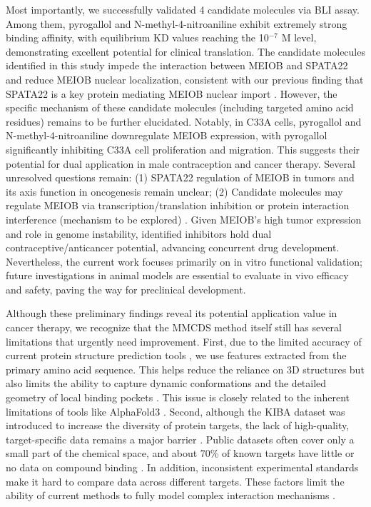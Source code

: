 \documentclass[preprint,12pt]{elsarticle}
\theoremstyle{plain}
\theoremstyle{definition}
\theoremstyle{remark}
\begin{document}
Most importantly, we successfully validated 4 candidate molecules via BLI assay. Among them, pyrogallol and N-methyl-4-nitroaniline exhibit extremely strong binding affinity, with equilibrium $\text{KD}$ values reaching the 10$^{-7}$ M level, demonstrating excellent potential for clinical translation. The candidate molecules identified in this study impede the interaction between MEIOB and SPATA22 and reduce MEIOB nuclear localization, consistent with our previous finding that SPATA22 is a key protein mediating MEIOB nuclear import \cite{10}. However, the specific mechanism of these candidate molecules (including targeted amino acid residues) remains to be further elucidated. Notably, in C33A cells, pyrogallol and N-methyl-4-nitroaniline downregulate MEIOB expression, with pyrogallol significantly inhibiting C33A cell proliferation and migration. This suggests their potential for dual application in male contraception and cancer therapy. Several unresolved questions remain: (1) SPATA22 regulation of MEIOB in tumors and its axis function in oncogenesis remain unclear; (2) Candidate molecules may regulate MEIOB via transcription/translation inhibition or protein interaction interference (mechanism to be explored) \cite{18}. Given MEIOB's high tumor expression and role in genome instability, identified inhibitors hold dual contraceptive/anticancer potential, advancing concurrent drug development. Nevertheless, the current work focuses primarily on in vitro functional validation; future investigations in animal models are essential to evaluate in vivo efficacy and safety, paving the way for preclinical development.

Although these preliminary findings reveal its potential application value in cancer therapy, we recognize that the MMCDS method itself still has several limitations that urgently need improvement. First, due to the limited accuracy of current protein structure prediction tools \cite{59,60}, we use features extracted from the primary amino acid sequence. This helps reduce the reliance on 3D structures but also limits the ability to capture dynamic conformations and the detailed geometry of local binding pockets \cite{61}. This issue is closely related to the inherent limitations of tools like AlphaFold3 \cite{62}. Second, although the KIBA dataset was introduced to increase the diversity of protein targets, the lack of high-quality, target-specific data remains a major barrier \cite{63,64}. Public datasets often cover only a small part of the chemical space, and about 70\% of known targets have little or no data on compound binding \cite{65}. In addition, inconsistent experimental standards make it hard to compare data across different targets. These factors limit the ability of current methods to fully model complex interaction mechanisms \cite{66}.
\end{document}

